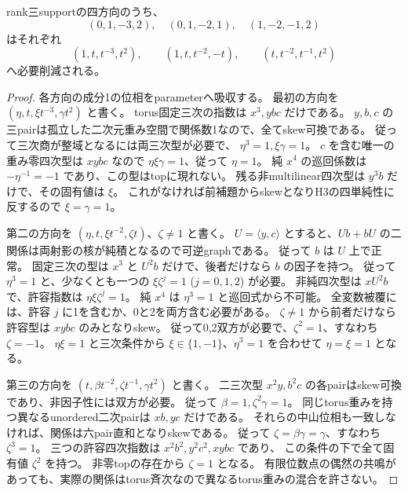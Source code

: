 \begin{proposition}
\label{prop:cubic-three-curve-phase-free}
rank三supportの四方向のうち、
\[
 (0,1,-3,2),\quad (0,1,-2,1),\quad (1,-2,-1,2)
\]
はそれぞれ
\[
 (1,t,t^{-3},t^2),\qquad
 (1,t,t^{-2},-t),\qquad
 (t,t^{-2},t^{-1},t^2)
\]
へ必要削減される。
\end{proposition}
\begin{proof}
各方向の成分1の位相をparameterへ吸収する。
最初の方向を $(\eta,t,\xi t^{-3},\gamma t^2)$ と書く。
torus固定三次の指数は $x^3,ybc$ だけである。
$y,b,c$ の三pairは孤立した二次元重み空間で関係数1なので、全てskew可換である。
従って三次商が整域となるには両三次型が必要で、
$\eta^3=1,\xi\gamma=1$。
$c$ を含む唯一の重み零四次型は $xybc$ なので $\eta\xi\gamma=1$、従って $\eta=1$。
純 $x^4$ の巡回係数は $-\eta^{-1}=-1$ であり、この型はtopに現れない。
残る非multilinear四次型は $y^3b$ だけで、その固有値は $\xi$。
これがなければ前補題からskewとなりH3の四単純性に反するので $\xi=\gamma=1$。

第二の方向を $(\eta,t,\xi t^{-2},\zeta t)$、$\zeta\ne1$ と書く。
$U=\langle y,c\rangle$ とすると、$Ub+bU$ の二関係は両射影の核が純積となるので可逆graphである。
従って $b$ は $U$ 上で正常。
固定三次の型は $x^3$ と $U^2b$ だけで、後者だけなら $b$ の因子を持つ。
従って $\eta^3=1$ と、少なくとも一つの
$\xi\zeta^j=1$ ($j=0,1,2$) が必要。
非純四次型は $xU^2b$ で、許容指数は $\eta\xi\zeta^j=1$。
純 $x^4$ は $\eta^3=1$ と巡回式から不可能。
全変数被覆には、許容 $j$ に1を含むか、0と2を両方含む必要がある。
$\zeta\ne1$ から前者だけなら許容型は $xybc$ のみとなりskew。
従って0,2双方が必要で、$\zeta^2=1$、すなわち $\zeta=-1$。
$\eta\xi=1$ と三次条件から $\xi\in\{1,-1\}$、$\eta^3=1$ を合わせて $\eta=\xi=1$ となる。

第三の方向を $(t,\beta t^{-2},\zeta t^{-1},\gamma t^2)$ と書く。
二三次型 $x^2y,b^2c$ の各pairはskew可換であり、非因子性には双方が必要。
従って $\beta=1,\zeta^2\gamma=1$。
同じtorus重みを持つ異なるunordered二次pairは $xb,yc$ だけである。
それらの中山位相も一致しなければ、関係は六pair直和となりskewである。
従って $\zeta=\beta\gamma=\gamma$、すなわち $\zeta^3=1$。
三つの許容四次指数は $x^2b^2,y^2c^2,xybc$ であり、
この条件の下で全て固有値 $\zeta^2$ を持つ。
非零topの存在から $\zeta=1$ となる。
有限位数点の偶然の共鳴があっても、実際の関係はtorus斉次なので異なるtorus重みの混合を許さない。
\end{proof}

